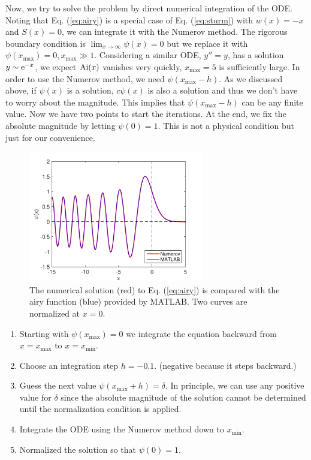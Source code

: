 Now, we try to solve the problem by direct numerical integration of the ODE. 
Noting that Eq. (\ref{eq:airy}) is a special case of Eq. (\ref{eq:sturm}) with $w(x)=-x$ and $S(x)=0$, we can integrate it with the Numerov method.  The rigorous boundary condition is $\displaystyle\lim_{x \rightarrow \infty} \psi(x) = 0$ but we replace it with $\psi(x_\text{max})=0, x_\text{max} \gg 1$.  Considering a similar ODE, $y''=y$, has a solution $y \sim \text{e}^{-x}$, we expect $\operatorname{Ai}(x)$ vanishes very quickly, $x_\text{max}=5$ is sufficiently large. 
 In order to use the Numerov method, we need $\psi(x_\text{max}-h)$.
As we discussed above, if $\psi(x)$ is a solution,   $c \psi(x)$ is also a solution and thus we don't have to worry about the magnitude.  This implies that $\psi(x_\text{max}-h)$ can be any finite value. Now we have two points to start the iterations.  At the end, we fix the absolute magnitude by letting $\psi(0)=1$.  This is not a physical condition but just for our convenience.

\begin{figure}
\centering
\includegraphics[width=3.0in]{06.ode2/airy_function.pdf}
\caption{The numerical solution (red) to Eq. (\ref{eq:airy}) is compared with the airy function (blue) provided by MATLAB.  Two curves are normalized at $x=0$.}
\label{fig:airy}
\end{figure}

\begin{myalgobox}
    
    \medskip
    \begin{minipage}{5in}
        \begin{enumerate}
            \item  Starting with $\psi(x_\text{max})=0$ we integrate the equation backward from $x=x_\text{max}$ to $x=x_\text{min}$.
            \item  Choose an integration step $h=-0.1$. (negative because it steps backward.)
            \item  Guess the next value $\psi(x_\text{max}+h)=\delta$.  In principle, we can use any positive value for $\delta$ since the absolute magnitude of the solution cannot be determined until the normalization condition is applied. 
            \item  Integrate the ODE using the Numerov method down to $x_\text{min}$.
            \item  Normalized the solution so that $\psi(0)=1$.
        \end{enumerate}
    \end{minipage}
\end{myalgobox}

